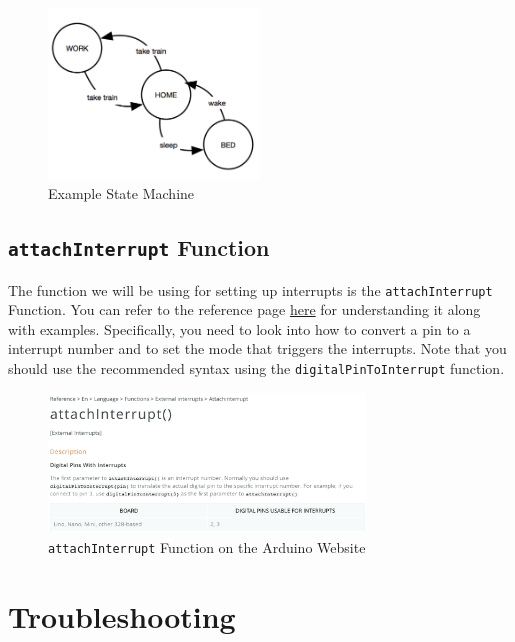 \documentclass{article}
\begin{document}
        
        \begin{figure}[ht]
            \centering
            \includegraphics[width = 0.5\textwidth]{images/StateMachine.png}
            \caption{Example State Machine}
        \end{figure}
        
    \subsection{\texttt{attachInterrupt} Function} \label{attachinterrupt}
        The function we will be using for setting up interrupts is the \texttt{attachInterrupt} Function. You can refer to the reference page \href{https://www.arduino.cc/reference/en/language/functions/external-interrupts/attachinterrupt}{here} for understanding it along with examples. Specifically, you need to look into how to convert a pin to a interrupt number and to set the mode that triggers the interrupts. Note that you should use the recommended syntax using the \texttt{digitalPinToInterrupt} function.
        
        \begin{figure}[ht]
            \centering
            \includegraphics[width = 0.75\textwidth]{images/AttachInterrupt.png}
            \caption{\texttt{attachInterrupt} Function on the Arduino Website}
        \end{figure}
        
\section{Troubleshooting}
\end{document}
